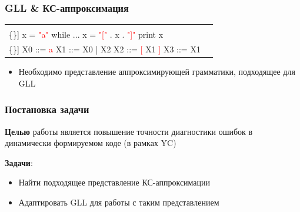 \documentclass{beamer}
\begin{document}
\begin{frame}[fragile]
	\transwipe[direction=90]
	\frametitle{GLL \& КС-аппроксимация}
	\begin{table}
		\begin{tabular}{p{5cm} p{5cm}}
			\begin{center}
				\begin{Verbatim}[commandchars=\\\{\}]
x = \textcolor{red}{"a"}
while ...
    x = \textcolor{red}{"["} . x . \textcolor{red}{"]"}
print x
				\end{Verbatim}
			\end{center}
		&
			\begin{center}
				\begin{Verbatim}[commandchars=\\\{\}]
X0 ::= \textcolor{red}{a}
X1 ::= X0 | X2
X2 ::= \textcolor{red}{[} X1 \textcolor{red}{]} 
X3 ::= X1
				\end{Verbatim}
			\end{center}
		\end{tabular}
	\end{table}
	\begin{itemize}
		\item Необходимо представление аппроксимирующей грамматики, подходящее для GLL
	\end{itemize}
\end{frame}

\begin{frame}
	\transwipe[direction=90]
	\frametitle{Постановка задачи}
	\textbf{Целью} работы является повышение точности диагностики ошибок в динамически формируемом коде (в рамках YC)
	
	\textbf{Задачи}:
	\begin{itemize}
		\item Найти подходящее представление КС-аппроксимации
		\item Адаптировать GLL для работы с таким представлением
	\end{itemize}
\end{frame}
\end{document}
